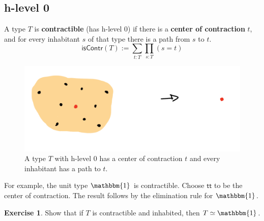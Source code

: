\documentclass{amsart}
\theoremstyle{definition}
\newtheorem{ex}{Exercise}[section]
\newcommand{\Unit}{\ensuremath{\mathbbm{1}}}
\newcommand{\isContr}{\ensuremath{\mathsf{isContr}}}
\renewcommand{\emph}{\textbf}
\begin{document}
\subsection{h-level 0}\label{sec:h-level-0}
A type $T$ is \emph{contractible} (has h-level 0) if there is a \emph{center of contraction} $t$, and for every inhabitant $s$ of that type there is a path from $s$ to $t$.
\[
    \isContr(T) := \sum_{t : T}\prod_{s : T} (s = t)
\]
\begin{figure}[h]
    \centering
    \includegraphics[scale=0.5]{hlvl0.png}
    \caption{A type $T$ with h-level 0 has a center of contraction $t$ and every inhabitant has a path to $t$.}
    \label{fig:h-level-0}
\end{figure}

For example, the unit type $\Unit$ is contractible.
Choose $\mathsf{tt}$ to be the center of contraction.
The result follows by the elimination rule for $\Unit$.

\begin{ex}
Show that if $T$ is contractible and inhabited, then $T \simeq \mathbbm{1}$.
\end{ex}

%    
\end{document}
